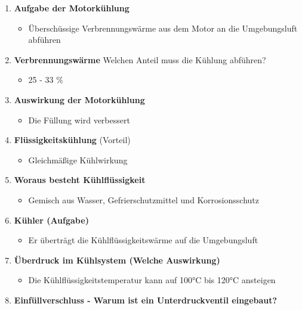 \begin{enumerate}
\item
  \textbf{Aufgabe der Motorkühlung}

  \begin{itemize}
  \item
    Überschüssige Verbrennungswärme aus dem Motor an die Umgebungsluft
    abführen
  \end{itemize}
\item
  \textbf{Verbrennungswärme} Welchen Anteil muss die Kühlung abführen?

  \begin{itemize}
  \item
    25 - 33 \%
  \end{itemize}
\item
  \textbf{Auswirkung der Motorkühlung}

  \begin{itemize}
  \item
    Die Füllung wird verbessert
  \end{itemize}
\item
  \textbf{Flüssigkeitskühlung} (Vorteil)

  \begin{itemize}
  \item
    Gleichmäßige Kühlwirkung
  \end{itemize}
\item
  \textbf{Woraus besteht Kühlflüssigkeit}

  \begin{itemize}
  \item
    Gemisch aus Wasser, Gefrierschutzmittel und Korrosionsschutz
  \end{itemize}
\item
  \textbf{Kühler (Aufgabe)}

  \begin{itemize}
  \item
    Er überträgt die Kühlflüssigkeitswärme auf die Umgebungsluft
  \end{itemize}
\item
  \textbf{Überdruck im Kühlsystem (Welche Auswirkung)}

  \begin{itemize}
  \item
    Die Kühlflüssigkeitstemperatur kann auf 100°C bis 120°C ansteigen
  \end{itemize}
\item
  \textbf{Einfüllverschluss - Warum ist ein Unterdruckventil eingebaut?}


\end{enumerate}
